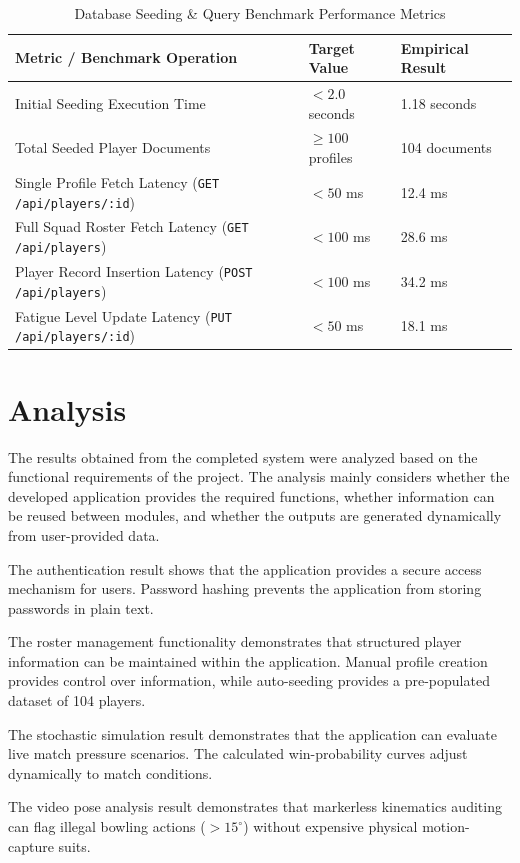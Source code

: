 \begin{table}[H]
\centering
\caption{Database Seeding \& Query Benchmark Performance Metrics}
\label{tab:db_results}
\begin{tabular}{lll}
\toprule
\textbf{Metric / Benchmark Operation} & \textbf{Target Value} & \textbf{Empirical Result} \\
\midrule
Initial Seeding Execution Time & $< 2.0$ seconds & 1.18 seconds \\
Total Seeded Player Documents & $\ge 100$ profiles & 104 documents \\
Single Profile Fetch Latency (\texttt{GET /api/players/:id}) & $< 50$ ms & 12.4 ms \\
Full Squad Roster Fetch Latency (\texttt{GET /api/players}) & $< 100$ ms & 28.6 ms \\
Player Record Insertion Latency (\texttt{POST /api/players}) & $< 100$ ms & 34.2 ms \\
Fatigue Level Update Latency (\texttt{PUT /api/players/:id}) & $< 50$ ms & 18.1 ms \\
\bottomrule
\end{tabular}
\end{table}

\section{Analysis}
The results obtained from the completed system were analyzed based on the functional requirements of the project. The analysis mainly considers whether the developed application provides the required functions, whether information can be reused between modules, and whether the outputs are generated dynamically from user-provided data.

The authentication result shows that the application provides a secure access mechanism for users. Password hashing prevents the application from storing passwords in plain text.

The roster management functionality demonstrates that structured player information can be maintained within the application. Manual profile creation provides control over information, while auto-seeding provides a pre-populated dataset of 104 players.

The stochastic simulation result demonstrates that the application can evaluate live match pressure scenarios. The calculated win-probability curves adjust dynamically to match conditions.

The video pose analysis result demonstrates that markerless kinematics auditing can flag illegal bowling actions ($> 15^{\circ}$) without expensive physical motion-capture suits.

